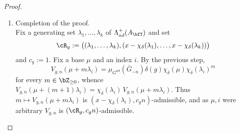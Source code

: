 \documentclass[12pt,a4paper]{amsart}%
\newcommand{\RamiA}[1]{{{#1}}}
\newcommand{\claude}[1]{{{#1}}}
\newcommand{\RamiD}[1]{{{#1}}}
\newcommand{\DimaA}[1]{{{#1}}}
\begin{document}
\begin{proof}
\begin{enumerate}[Step 1.]
    Conjugation by $\bar t$ fixes $\overline{T\cap G_{-n}}$ \claude{by }.
    \RamiD{
    By \eqref{lem:U.filtration:3} we have
    $$
t\,(U^-\cap G_{-n})\,t^{-1}>U^-\cap G_{-n}
$$ and
    $$
t\,(U\cap G_{-n})\,t^{-1}<U\cap G_{-n}.
$$ 
Thus
$$\bar G_{-n}\cap \bar t\bar G_{-n}\bar t^{-1}=\Bigl(\overline{U^{-}\cap G_{-n}}\Bigr)\,\overline{T\cap G_{-n}}\,\Bigl(\overline{t(U\cap G_{-n}) t^{-1}} \Bigr).$$
    Hence:
    }    
    \begin{align*}
    [\bar G_{-n}:\bar G_{-n}\cap \bar t\bar G_{-n}\bar t^{-1}]
    &\mathrel{\RamiD{=}}\RamiD{[U\cap G_{-n} :t(U\cap G_{-n}) t^{-1}]}\\
    &\mathrel{\RamiD{=}}\RamiD{\mu_{U}(U\cap G_{-n}) /\mu_{U}(t(U\cap G_{-n}) t^{-1})}\\
    &\mathrel{\RamiD{\overset{\eqref{eq:delta}}{=}}}\delta(t),
    \end{align*}
    \RamiD{where $\mu_U$ is a Haar measure on $U$.}
    Finally $\bar G_{-n}\bar t\bar G_{-n}$ is the disjoint union of the cosets $\bar z\bar t\bar G_{-n}$, where $\bar z$ runs over $\bar G_{-n}/(\bar G_{-n}\cap \bar t\bar G_{-n}\bar t^{-1})$, each of measure $\mu_{G^{ad}}(\bar G_{-n})$, so that
    $$V_{g,n}(\lambda)=\mu_{G^{ad}}(\bar G_{-n}\bar t\bar G_{-n})=\mu_{G^{ad}}(\bar G_{-n})\,\delta(t),$$
    and $\delta(t)=\delta(\varpi^{\tilde\lambda})\delta(g)=\chi_\delta(\lambda)\delta(g)$, proving the claim.
    \item \RamiA{Completion of the proof}.\\
    Fix a generating set $\lambda_1,\dots,\lambda_k$ of $\Lambda^+_{ad}({A_{\bfT}})$ and set $$\cR_g:=\bigl((\lambda_1,\dots,\lambda_k),(x-\chi_\delta(\lambda_1),\dots,x-\chi_\delta(\lambda_k))\bigr)$$ and $c_g:=1$. Fix a base $\mu$ and an index $i$. By the \DimaA{previous step,} 
    $$V_{g,n}(\mu+m\lambda_i)=\mu_{G^{ad}}(\bar G_{-n})\delta(g)\chi_\delta(\mu)\chi_\delta(\lambda_i)^m$$ for every $m\in\Z_{\geq0}$, whence $V_{g,n}(\mu+(m+1)\lambda_i)=\chi_\delta(\lambda_i)\,V_{g,n}(\mu+m\lambda_i)$. Thus $m\mapsto V_{g,n}(\mu+m\lambda_i)$ is $(x-\chi_\delta(\lambda_i),c_gn)$-admissible, and as $\mu,i$ were arbitrary $V_{g,n}$ is $(\cR_g,c_gn)$-admissible.
    \end{enumerate}
\end{proof}
\end{document}
